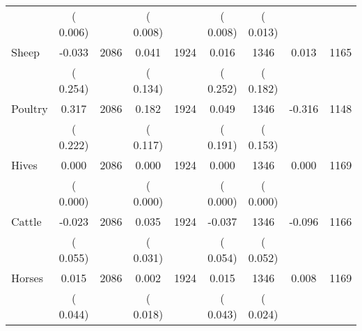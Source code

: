 \begin{tabular}{l*{8}{c}}
                       &       (       0.006)            &                               &       (       0.008)            &                               &       (       0.008)            &       (       0.013) &                  \\
Sheep        &             -0.033      &       2086       &              0.041      &       1924       &              0.016      &       1346  &        0.013 &       1165       \\
                       &       (       0.254)            &                               &       (       0.134)            &                               &       (       0.252)            &       (       0.182) &                  \\
Poultry        &              0.317      &       2086       &              0.182      &       1924       &              0.049      &       1346  &       -0.316 &       1148       \\
                       &       (       0.222)            &                               &       (       0.117)            &                               &       (       0.191)            &       (       0.153) &                  \\
Hives        &              0.000      &       2086       &              0.000      &       1924       &              0.000      &       1346  &        0.000 &       1169       \\
                       &       (       0.000)            &                               &       (       0.000)            &                               &       (       0.000)            &       (       0.000) &                  \\
Cattle        &             -0.023      &       2086       &              0.035      &       1924       &             -0.037      &       1346  &       -0.096 &       1166       \\
                       &       (       0.055)            &                               &       (       0.031)            &                               &       (       0.054)            &       (       0.052) &                  \\
Horses        &              0.015      &       2086       &              0.002      &       1924       &              0.015      &       1346  &        0.008 &       1169       \\
                       &       (       0.044)            &                               &       (       0.018)            &                               &       (       0.043)            &       (       0.024) &                  \\
\hline \end{tabular}